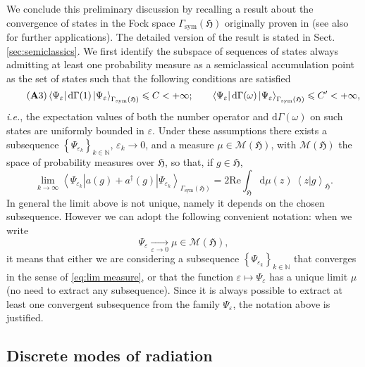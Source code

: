 \documentclass[11pt,a4paper,reqno]{amsart}
\renewcommand{\Re}{\mathrm{Re}}
\theoremstyle{definition}
\numberwithin{equation}{section}
\newcommand{\beq}{\begin{equation}}
\newcommand{\eeq}{\end{equation}}
\renewcommand{\leq}{\leqslant}
\newcommand{\lf}{\left}
\newcommand{\ri}{\right}
\newcommand{\bra}[1]{\lf\langle #1\ri|}
\newcommand{\ket}[1]{\lf|#1 \ri\rangle}
\newcommand{\braket}[2]{\lf\langle #1|#2 \ri\rangle}
\newcommand{\mean}[3]{\bra{#1}#2\ket{#3}}
\newcommand{\meanlr}[3]{\lf\langle #1\lf|#2\ri|#3\ri\rangle}
\newcommand{\diff}{\mathrm{d}}
\newcommand{\eps}{\varepsilon}
\newcommand{\M}{\mathscr{M}}
\newcommand{\hh}{\mathfrak{H}}
\newcommand{\fock}{\Gamma_{\mathrm{sym}}}
\begin{document}
We conclude this preliminary discussion by recalling a result about the convergence of states in the Fock space $ \Gamma_{\mathrm{sym}}\lf(\mathfrak{H}\ri) $ originally proven in \cite{ammari:nier:2008,MR2513969,MR2802894,2011arXiv1111.5918A} (see also \cite{Ammari:2014aa,ammari:15} for further applications). The detailed version of the result is stated in Sect. \ref{sec:semiclassics}. We first identify the subspace of sequences of states always admitting at least one probability measure as a semiclassical accumulation point as the set of states such that the following conditions are satisfied
	\beq
		\label{eq:state}\tag{{\bf A}3}
		\mean{\Psi_\varepsilon}{\mathrm{d}\Gamma(1)}{\Psi_\varepsilon}_{\fock(\hh)} \leq C < + \infty; 	\qquad		\mean{\Psi_\varepsilon}{\mathrm{d}\Gamma(\omega)}{\Psi_\varepsilon}_{\fock(\hh)} \leq C' < +\infty,
	\eeq
{\it i.e.}, the expectation values of both the number operator and $ \diff \Gamma(\omega) $ on such states are uniformly bounded in $ \eps $. Under these assumptions there exists a subsequence $ \lf\{ \Psi_{\eps_k} \ri\}_{k\in \mathbb{N}}$, $\varepsilon_k\to 0$, and a measure $ \mu \in \M(\hh) $, with $ \M(\hh) $ the space of probability measures over $ \hh $, so that, if $ g \in \hh $,
\begin{equation}
  	\label{eq:lim measure}
  	\lim_{k\to \infty} \meanlr{\Psi_{\varepsilon_k}}{a(g) + a^{\dagger}(g)}{\Psi_{\varepsilon_k}}_{\Gamma_{\mathrm{sym}}\lf(\mathfrak{H}\ri)} = 2 \Re \int_{\hh}^{} \mathrm{d}\mu(z) \: \braket{z}{g}_{\hh}.
\end{equation}
In general the limit above is not unique, namely it depends on the chosen subsequence. However we can adopt the following convenient notation: when we write
\beq
	\label{eq:eps convergence}
	\Psi_{\eps} \xrightarrow[\eps \to 0]{} \mu\in \mathscr{M}(\hh),
\eeq
it means that either we are considering a subsequence
$ \lf\{ \Psi_{\varepsilon_k} \ri\}_{k\in \mathbb{N}}$ that converges in the sense of \eqref{eq:lim measure}, or that the function
$\varepsilon\mapsto \Psi_{\varepsilon}$ has a unique limit $\mu$ (no need to extract any subsequence). Since it is always possible to extract at least one convergent
subsequence from the family $ \Psi_{\varepsilon} $, the notation above is justified. 

\subsection{Discrete modes of radiation}
\label{sec:discrete}
\end{document}
